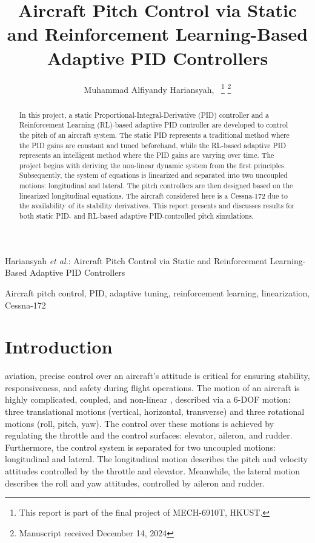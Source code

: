 \documentclass[lettersize,journal]{IEEEtran}
\begin{document}
\title{Aircraft Pitch Control via Static and Reinforcement Learning-Based Adaptive PID Controllers}

\author{Muhammad Alfiyandy Hariansyah,~%
\thanks{This report is part of the final project of MECH-6910T, HKUST.}%
\thanks{Manuscript received December 14, 2024}}

%
{Hariansyah \MakeLowercase{\textit{et al.}}: Aircraft Pitch Control via Static and Reinforcement Learning-Based Adaptive PID Controllers}

\maketitle

\begin{abstract}
In this project, a static Proportional-Integral-Derivative (PID) controller and a Reinforcement Learning (RL)-based adaptive PID controller are developed to control the pitch of an aircraft system. The static PID represents a traditional method where the PID gains are constant and tuned beforehand, while the RL-based adaptive PID represents an intelligent method where the PID gains are varying over time. The project begins with deriving the non-linear dynamic system from the first principles. Subsequently, the system of equations is linearized and separated into two uncoupled motions: longitudinal and lateral. The pitch controllers are then designed based on the linearized longitudinal equations. The aircraft considered here is a Cessna-172 due to the availability of its stability derivatives. This report presents and discusses results for both static PID- and RL-based adaptive PID-controlled pitch simulations.
\end{abstract}

\begin{IEEEkeywords}
Aircraft pitch control, PID, adaptive tuning, reinforcement learning, linearization, Cessna-172
\end{IEEEkeywords}

\section{Introduction}

 aviation, precise control over an aircraft’s attitude is critical for ensuring stability, responsiveness, and safety during flight operations. The motion of an aircraft is highly complicated, coupled, and non-linear \cite{ref1}, described via a 6-DOF motion: three translational motions (vertical, horizontal, transverse) and three rotational motions (roll, pitch, yaw). The control over these motions is achieved by regulating the throttle and the control surfaces: elevator, aileron, and rudder. Furthermore, the control system is separated for two uncoupled motions: longitudinal and lateral. The longitudinal motion describes the pitch and velocity attitudes controlled by the throttle and elevator. Meanwhile, the lateral motion describes the roll and yaw attitudes, controlled by aileron and rudder.
\end{document}
